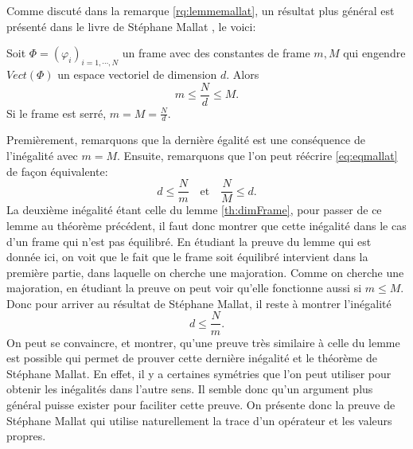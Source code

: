 Comme discuté dans la remarque \ref{rq:lemmemallat}, un résultat plus général est présenté dans le livre de Stéphane Mallat \cite{mallatframe}, le voici:
\begin{theoreme}[Mallat]
	Soit $\Phi =(\varphi_i)_{i=1, \cdots, N}$ un frame avec des constantes de frame $m,M$ qui engendre $Vect(\Phi)$ un espace vectoriel de dimension $d$.
	Alors
	\begin{equation}\label{eq:eqmallat}
		m \leq \frac{N}{d} \leq M.
	\end{equation}
	Si le frame est serré, $m=M=\frac{N}{d}$.
\end{theoreme}
Premièrement, remarquons que la dernière égalité est une conséquence de l'inégalité avec $m=M$.
\newline 
Ensuite, remarquons que l'on peut réécrire \ref{eq:eqmallat} de façon équivalente:
	\begin{equation}
		d \leq \frac{N}{m} \quad \text{et} \quad \frac{N}{M} \leq d.
	\end{equation}
	La deuxième inégalité étant celle du lemme \ref{th:dimFrame}, pour passer de ce lemme au théorème précédent, il faut donc montrer que cette inégalité dans le cas d'un frame qui n'est pas équilibré.
	En étudiant la preuve du lemme qui est donnée ici, on voit que le fait que le frame soit équilibré intervient dans la première partie, dans laquelle on cherche une majoration.
	Comme on cherche une majoration, en étudiant la preuve on peut voir qu'elle fonctionne aussi si $m\leq M$.
	Donc pour arriver au résultat de Stéphane Mallat, il reste à montrer l'inégalité
	\begin{equation}
		d \leq \frac{N}{m}.
	\end{equation}
	On peut se convaincre, et montrer, qu'une preuve très similaire à celle du lemme est possible qui permet de prouver cette dernière inégalité et le théorème de Stéphane Mallat.
	En effet, il y a certaines symétries que l'on peut utiliser pour obtenir les inégalités dans l'autre sens. 
	Il semble donc qu'un argument plus général puisse exister pour faciliter cette preuve.
	On présente donc la preuve de Stéphane Mallat qui utilise naturellement la trace d'un opérateur et les valeurs propres.
